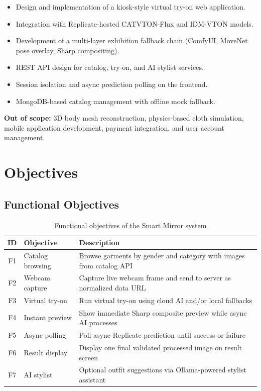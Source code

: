 \begin{itemize}[leftmargin=*]
  \item Design and implementation of a kiosk-style virtual try-on web application.
  \item Integration with Replicate-hosted CATVTON-Flux and IDM-VTON models.
  \item Development of a multi-layer exhibition fallback chain (ComfyUI, MoveNet pose overlay, Sharp compositing).
  \item REST API design for catalog, try-on, and AI stylist services.
  \item Session isolation and async prediction polling on the frontend.
  \item MongoDB-based catalog management with offline mock fallback.
\end{itemize}

\textbf{Out of scope:} 3D body mesh reconstruction, physics-based cloth simulation, mobile application development, payment integration, and user account management.

\section{Objectives}
\label{sec:objectives}

\subsection{Functional Objectives}

\begin{table}[H]
  \centering
  \caption{Functional objectives of the Smart Mirror system}
  \label{tab:functional-objectives}
  \begin{tabular}{@{}clp{9cm}@{}}
    \toprule
    \textbf{ID} & \textbf{Objective} & \textbf{Description} \\
    \midrule
    F1 & Catalog browsing & Browse garments by gender and category with images from catalog API \\
    F2 & Webcam capture & Capture live webcam frame and send to server as normalized data URL \\
    F3 & Virtual try-on & Run virtual try-on using cloud AI and/or local fallbacks \\
    F4 & Instant preview & Show immediate Sharp composite preview while async AI processes \\
    F5 & Async polling & Poll async Replicate prediction until success or failure \\
    F6 & Result display & Display one final validated processed image on result screen \\
    F7 & AI stylist & Optional outfit suggestions via Ollama-powered stylist assistant \\
    \bottomrule
  \end{tabular}
\end{table}

